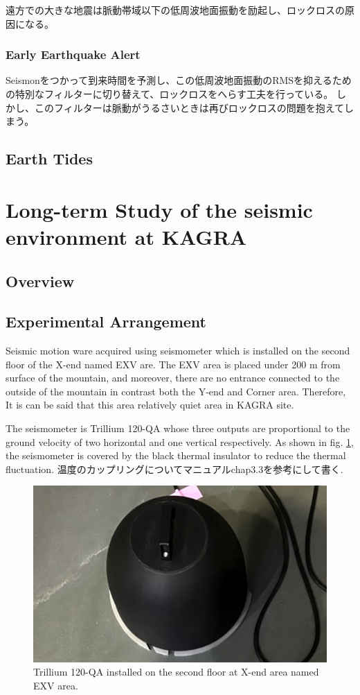 遠方での大きな地震は脈動帯域以下の低周波地面振動を励起し、ロックロスの原因になる。
\subsubsection{Early Earthquake Alert}
Seismonをつかって到来時間を予測し、この低周波地面振動のRMSを抑えるための特別なフィルターに切り替えて、ロックロスをへらす工夫を行っている。
しかし、このフィルターは脈動がうるさいときは再びロックロスの問題を抱えてしまう。
\subsection{Earth Tides}

\section{Long-term Study of the seismic environment at KAGRA}
\subsection{Overview}
\subsection{Experimental Arrangement}
Seismic motion ware acquired using seismometer which is installed on the second floor of the X-end named EXV are. The EXV area is placed under 200 $\mathrm{m}$ from surface of the mountain, and moreover, there are no entrance connected to the outside of the mountain in contrast both the Y-end and Corner area. Therefore, It is can be said that this area relatively quiet area in KAGRA site. 

The seismometer is Trillium 120-QA whose three outputs are proportional to the ground velocity of two horizontal and one vertical respectively. As shown in fig. \ref{img:img316}, the seismometer is covered by the black thermal insulator to reduce the thermal fluctuation. 温度のカップリングについてマニュアルchap3.3を参考にして書く\cite{trillium120manual}.

\begin{figure}[H]
  \begin{center}   
    \includegraphics[width=12.0cm]{./img_chap3/img316.png}
    \caption{Trillium 120-QA installed on the second floor at X-end area named EXV area.}\label{img:img316}
  \end{center}
\end{figure}


